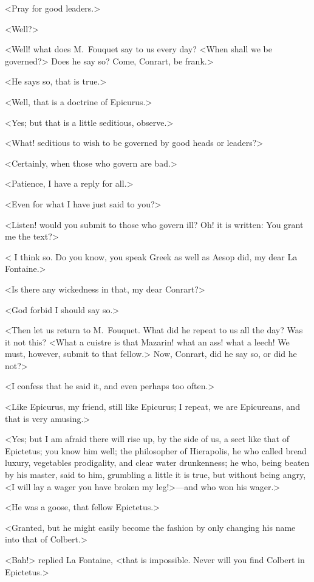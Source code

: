 <Pray for good leaders.>

<Well?>

<Well! what does M.~Fouquet say to us every day? <When shall we be governed?> Does he say so? Come, Conrart, be frank.>

<He says so, that is true.>

<Well, that is a doctrine of Epicurus.>

<Yes; but that is a little seditious, observe.>

<What! seditious to wish to be governed by good heads or leaders?>

<Certainly, when those who govern are bad.>

<Patience, I have a reply for all.>

<Even for what I have just said to you?>

<Listen! would you submit to those who govern ill? Oh! it is written:  You grant me the text?>

< I think so. Do you know, you speak Greek as well as Aesop did, my dear La Fontaine.>

<Is there any wickedness in that, my dear Conrart?>

<God forbid I should say so.>

<Then let us return to M.~Fouquet. What did he repeat to us all the day? Was it not this? <What a cuistre is that Mazarin! what an ass! what a leech! We must, however, submit to that fellow.> Now, Conrart, did he say so, or did he not?>

<I confess that he said it, and even perhaps too often.>

<Like Epicurus, my friend, still like Epicurus; I repeat, we are Epicureans, and that is very amusing.>

<Yes; but I am afraid there will rise up, by the side of us, a sect like that of Epictetus; you know him well; the philosopher of Hierapolis, he who called bread luxury, vegetables prodigality, and clear water drunkenness; he who, being beaten by his master, said to him, grumbling a little it is true, but without being angry, <I will lay a wager you have broken my leg!>—and who won his wager.>

<He was a goose, that fellow Epictetus.>

<Granted, but he might easily become the fashion by only changing his name into that of Colbert.>

<Bah!> replied La Fontaine, <that is impossible. Never will you find Colbert in Epictetus.>

